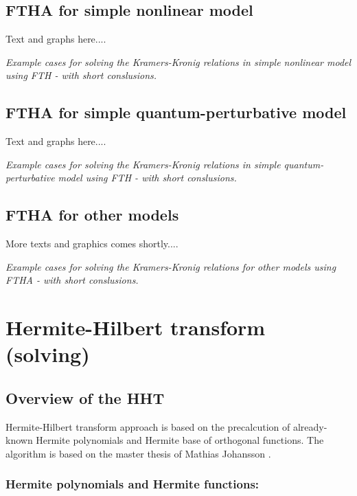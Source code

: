 \documentclass[12pt,twoside,a4paper]{article}
\numberwithin{equation}{subsection}
\numberwithin{figure}{subsection}
\begin{document}
\subsection{FTHA for simple nonlinear model} \label{chap:hartley_nlo}

Text and graphs here.... 

\textit{Example cases for solving the Kramers-Kronig relations in simple nonlinear model using FTH - with short conslusions.}

\subsection{FTHA for simple quantum-perturbative model} \label{chap:hartley_quantum}

Text and graphs here.... 

\textit{Example cases for solving the Kramers-Kronig relations in simple quantum-perturbative model using FTH - with short
conslusions.}

\subsection{FTHA for other models} \label{chap:hartley_other}

More texts and graphics comes shortly.... 

\textit{Example cases for solving the Kramers-Kronig relations for other models using FTHA - with short conslusions.}

\section{Hermite-Hilbert transform (solving)} \label{chap:hermite}

\subsection{Overview of the HHT}  \label{chap:hermite_overview}

Hermite-Hilbert transform approach is based on the precalcution of already-known Hermite polynomials and Hermite base of orthogonal
functions. The algorithm is based on the master thesis of Mathias Johansson \cite{johansson_hilbert}.

\subsubsection*{Hermite polynomials and Hermite functions:}
\end{document}
